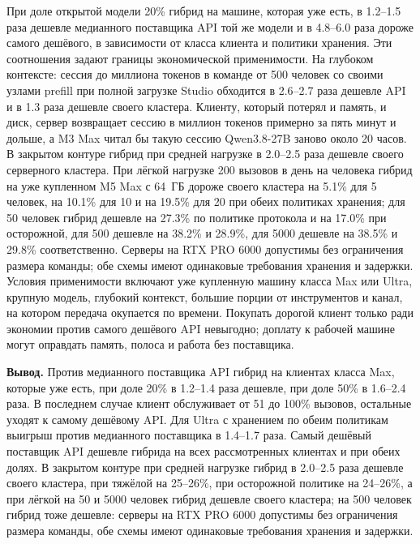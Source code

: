 При доле открытой модели 20\% гибрид на машине, которая уже есть, в 1.2--1.5 раза дешевле медианного поставщика
API той же модели и в 4.8--6.0 раза дороже самого дешёвого, в зависимости от класса клиента и политики хранения. Эти соотношения задают границы экономической применимости. На глубоком контексте: сессия до миллиона
токенов в команде от 500 человек со своими узлами prefill при полной загрузке Studio обходится в 2.6--2.7 раза дешевле API и
в 1.3 раза дешевле своего кластера. Клиенту, который потерял и память, и диск, сервер возвращает сессию в
миллион токенов примерно за пять минут и дольше, а M3 Max читал бы такую сессию Qwen3.8-27B заново около 20 часов. В закрытом контуре гибрид при средней нагрузке в 2.0--2.5 раза дешевле своего серверного кластера. При лёгкой нагрузке 200 вызовов в день на человека
гибрид на уже купленном M5 Max с 64~ГБ дороже своего кластера на 5.1\% для 5 человек, на 10.1\% для 10 и на 19.5\% для 20
при обеих политиках хранения; для 50 человек гибрид дешевле на 27.3\% по политике протокола и на 17.0\% при осторожной,
для 500 дешевле на 38.2\% и 28.9\%, для 5000 дешевле на 38.5\% и 29.8\% соответственно.
Серверы на RTX PRO 6000 допустимы без ограничения размера команды; обе схемы имеют одинаковые требования хранения и задержки. Условия применимости включают уже купленную машину класса Max или Ultra,
крупную модель, глубокий контекст, большие порции от инструментов и канал, на котором передача окупается по времени. Покупать дорогой клиент только ради экономии против самого
дешёвого API невыгодно; доплату к рабочей машине могут оправдать память, полоса и работа без поставщика.

\textbf{Вывод.} Против медианного поставщика API гибрид на клиентах класса Max,
которые уже есть, при доле 20\% в 1.2--1.4 раза дешевле, при доле 50\% в 1.6--2.4 раза.
В последнем случае клиент обслуживает от 51 до 100\% вызовов, остальные уходят к самому дешёвому API.
Для Ultra с хранением по обеим политикам выигрыш против медианного поставщика в 1.4--1.7 раза.
Самый дешёвый поставщик API дешевле гибрида на всех рассмотренных клиентах и при обеих долях.
В закрытом контуре при средней нагрузке гибрид в 2.0--2.5 раза дешевле своего кластера, при тяжёлой на 25--26\%,
при осторожной политике на 24--26\%, а при лёгкой на 50 и 5000 человек гибрид дешевле своего кластера; на 500 человек гибрид тоже дешевле:
серверы на RTX PRO 6000 допустимы без ограничения размера команды, обе схемы имеют одинаковые требования хранения и задержки.

